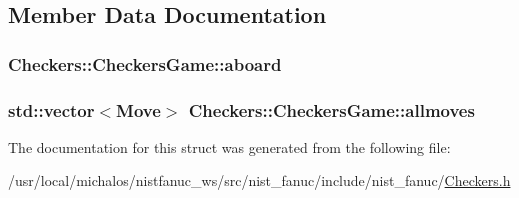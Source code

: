 \subsection{Member Data Documentation}
\hypertarget{structCheckers_1_1CheckersGame_a22097b8589bb666be943e164838ba203}{
\subsubsection[{aboard}]{ Checkers\-::\-Checkers\-Game\-::aboard}}\label{structCheckers_1_1CheckersGame_a22097b8589bb666be943e164838ba203}
\hypertarget{structCheckers_1_1CheckersGame_ad6f603403bf34af2f52f49b7efb9862a}{
\subsubsection[{allmoves}]{\setlength{\rightskip}{0pt plus 5cm}std\-::vector$<${\bf Move}$>$ Checkers\-::\-Checkers\-Game\-::allmoves}}\label{structCheckers_1_1CheckersGame_ad6f603403bf34af2f52f49b7efb9862a}


The documentation for this struct was generated from the following file\-:\begin{DoxyCompactItemize}
\item 
/usr/local/michalos/nistfanuc\-\_\-ws/src/nist\-\_\-fanuc/include/nist\-\_\-fanuc/\hyperlink{Checkers_8h}{Checkers.\-h}\end{DoxyCompactItemize}
